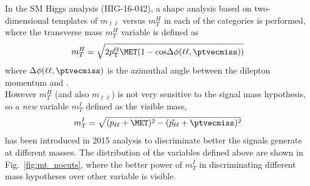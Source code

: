 In the SM Higgs analysis (HIG-16-042),  a shape analysis based on two-dimensional templates of $m_{\ell \ell}$ versus $m_T^H$ in each of the categories is performed, where  the transverse mass  $m_T^H$ variable is defined as  
\begin{equation}
 m_T^H = \sqrt{2p_{\rm T}^{\ell\ell}\MET(1-\mathrm{cos}\Delta\phi(\ell\ell, \ptvecmiss))}
\end{equation}
where $\Delta\phi(\ell\ell, \ptvecmiss)$ is the azimuthal angle between the dilepton momentum and \ptvecmiss.\\
However  $m_T^H$ (and also $m_{\ell \ell}$) is not very sensitive to the
signal mass hypothesis, so a \textit{new} variable $m_T^I$ defined as the visible mass,
\begin{equation}
 m_T^I = \sqrt{ (p_\mathrm{\ell\ell} + \MET)^2 - (\vec{p}_\mathrm{\ell\ell} + \ptvecmiss)^2 }
\end{equation}
has been introduced in 2015 analysis to discriminate better the signals generate at different masses.
The distribution of the variables defined above are shown in
Fig.~\ref{fig:mt_nocuts}, where the better power of $m_T^I$ in discriminating
different mass hypotheses over other variable is visible.

